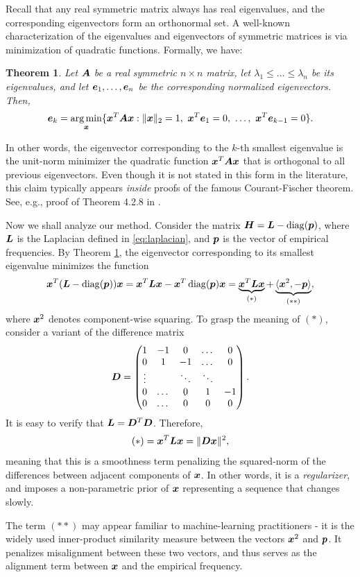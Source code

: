 \documentclass[10pt]{article} %
\newtheorem{theorem}{Theorem}
\DeclareMathOperator{\diag}{diag}
\begin{document}
Recall that any real symmetric matrix always has real eigenvalues, and the corresponding eigenvectors form an orthonormal set. A well-known characterization of the eigenvalues and eigenvectors of symmetric matrices is via minimization of quadratic functions. Formally, we have:
\begin{theorem}\label{thm:courant_fischer}
Let ${\bm{A}}$ be a real symmetric $n \times n$ matrix, let $\lambda_1 \leq \dots \leq\lambda_n$ be its eigenvalues, and let ${\bm{e}}_1, \dots, {\bm{e}}_n$ be the corresponding normalized eigenvectors. Then,
\[
{\bm{e}}_k = \operatorname*{arg\,min}_{{\bm{x}}} \{ {\bm{x}}^T {\bm{A}} {\bm{x}} : \|{\bm{x}}\|_2 = 1,~{\bm{x}}^T {\bm{e}}_1 = 0,~\ldots,~{\bm{x}}^T {\bm{e}}_{k-1} = 0 \}.
\]
\end{theorem}
In other words, the eigenvector corresponding to the $k$-th smallest eigenvalue is the unit-norm minimizer the quadratic function ${\bm{x}}^T {\bm{A}} {\bm{x}}$ that is orthogonal to all previous eigenvectors. Even though it is not stated in this form in the literature, this claim typically appears \emph{inside} proofs of the famous Courant-Fischer theorem. See, e.g., proof of Theorem 4.2.8 in \citet{horn2012matrix}.

Now we shall analyze our method. Consider the matrix $\mH = \mL - \diag(\vp)$, where ${\bm{L}}$ is the Laplacian defined in \eqref{eq:laplacian}, and ${\bm{p}}$ is the vector of empirical frequencies. By Theorem \ref{thm:courant_fischer}, the eigenvector corresponding to its smallest eigenvalue minimizes the function
\[
\vx^T (\mL - \diag(\vp)) \vx = \vx^T \mL \vx - \vx^T \diag(\vp) \vx = \underbrace{\vx^T \mL \vx}_{(*)} + \underbrace{\langle \vx^2, -\vp \rangle}_{(**)},
\]
where ${\bm{x}}^2$ denotes component-wise squaring. To grasp the meaning of $(*)$, consider a variant of the difference matrix
\[
{\bm{D}} = \begin{pmatrix}
    1 & -1 & 0 & \dots & 0 \\
    0 & 1 & -1 & \dots & 0 \\
    \vdots &   & \ddots & \ddots \\
    0 & \dots & 0 & 1 & -1 \\
    0 & \dots & 0 & 0 & 0
\end{pmatrix}.
\]
It is easy to verify that ${\bm{L}} = {\bm{D}}^T {\bm{D}}$. Therefore,
\[
(*) = {\bm{x}}^T {\bm{L}} {\bm{x}} = \| {\bm{D}} {\bm{x}} \|^2,
\]
meaning that this is a smoothness term penalizing the squared-norm of the differences between adjacent components of ${\bm{x}}$. In other words, it is a \emph{regularizer}, and imposes a non-parametric prior of ${\bm{x}}$ representing a sequence that changes slowly.

The term $(**)$ may appear familiar to machine-learning practitioners - it is the widely used inner-product similarity measure between the vectors ${\bm{x}}^2$ and ${\bm{p}}$. It penalizes misalignment between these two vectors, and thus serves as the alignment term between ${\bm{x}}$ and the empirical frequency.
\end{document}
